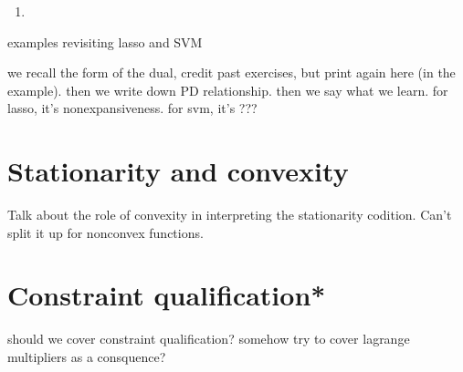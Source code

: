 \begin{Example}
\begin{enumerate}[label=\alph*., ref=\alph*]
\begin{equation}
  \lambda.  
  \end{equation}
  We can hence write the dual solution as , the
  projection of $y$ onto the convex set (in fact, polyhedron)
  \[
  C = \{ u : \|X^\T u\|_\infty \leq \lambda \}. 
  \]
  From \eqref{eq:lasso_primal_dual}, we infer that , the residual from projection onto $C$. As the residual 
  from projection onto a convex set is always nonexpansive
  \eqref{eq:projection_residual_nonexpansiveness}, writing ---which is called the lasso fitted vector (or simply lasso
  fit)---in this form allows us to deduce the following smoothness property. For
  any two response vectors $y, y' \in \R^n$ and their corresponding lasso fitted 
  vectors , we have       
  \begin{equation}
  \label{eq:lasso_nonexpansive}
  \|X \hbeta(y) - X \hbeta(y')\|_2 \leq \|y - y'\|_2.
  \end{equation}
  That is, the lasso fit  is Lipschitz continuous as a
  function of $y$ (with Lipschitz constant $L = 1$), thus differentiable almost
  everywhere (by Rademacher's theorem).   

\item {}
\end{enumerate}
\end{Example}

examples revisiting lasso and SVM

we recall the form of the dual, credit past exercises, but print again here (in
the example). then we write down PD relationship. then we say what we learn. for
lasso, it's nonexpansiveness. for svm, it's ???

\section{Stationarity and convexity}

Talk about the role of convexity in interpreting the stationarity codition.
Can't split it up for nonconvex functions.

\section{Constraint qualification*}

should we cover constraint qualification? 
somehow try to cover lagrange multipliers as a consquence?

